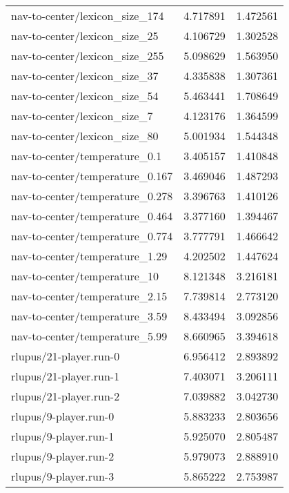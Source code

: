 \begin{tabular}{lrr}
nav-to-center/lexicon\_size\_174 & 4.717891 & 1.472561 \\
nav-to-center/lexicon\_size\_25 & 4.106729 & 1.302528 \\
nav-to-center/lexicon\_size\_255 & 5.098629 & 1.563950 \\
nav-to-center/lexicon\_size\_37 & 4.335838 & 1.307361 \\
nav-to-center/lexicon\_size\_54 & 5.463441 & 1.708649 \\
nav-to-center/lexicon\_size\_7 & 4.123176 & 1.364599 \\
nav-to-center/lexicon\_size\_80 & 5.001934 & 1.544348 \\
nav-to-center/temperature\_0.1 & 3.405157 & 1.410848 \\
nav-to-center/temperature\_0.167 & 3.469046 & 1.487293 \\
nav-to-center/temperature\_0.278 & 3.396763 & 1.410126 \\
nav-to-center/temperature\_0.464 & 3.377160 & 1.394467 \\
nav-to-center/temperature\_0.774 & 3.777791 & 1.466642 \\
nav-to-center/temperature\_1.29 & 4.202502 & 1.447624 \\
nav-to-center/temperature\_10 & 8.121348 & 3.216181 \\
nav-to-center/temperature\_2.15 & 7.739814 & 2.773120 \\
nav-to-center/temperature\_3.59 & 8.433494 & 3.092856 \\
nav-to-center/temperature\_5.99 & 8.660965 & 3.394618 \\
rlupus/21-player.run-0 & 6.956412 & 2.893892 \\
rlupus/21-player.run-1 & 7.403071 & 3.206111 \\
rlupus/21-player.run-2 & 7.039882 & 3.042730 \\
rlupus/9-player.run-0 & 5.883233 & 2.803656 \\
rlupus/9-player.run-1 & 5.925070 & 2.805487 \\
rlupus/9-player.run-2 & 5.979073 & 2.888910 \\
rlupus/9-player.run-3 & 5.865222 & 2.753987 \\
\bottomrule
\end{tabular}
